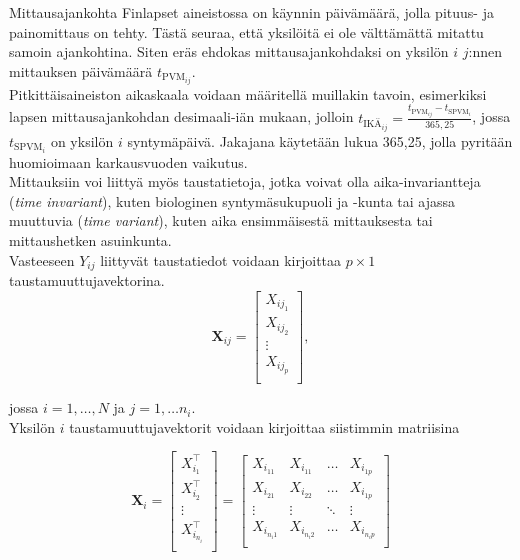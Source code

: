 \documentclass[finnish]{docopts}
\begin{document}
Mittausajankohta Finlapset aineistossa on käynnin päivämäärä, jolla pituus- ja painomittaus on tehty. Tästä seuraa, että yksilöitä ei ole välttämättä mitattu samoin ajankohtina. Siten eräs ehdokas mittausajankohdaksi on yksilön $i$ $j$:nnen mittauksen päivämäärä $t_{\text{PVM}_{ij}}$.\\

Pitkittäisaineiston aikaskaala voidaan määritellä muillakin tavoin, esimerkiksi lapsen mittausajankohdan desimaali-iän mukaan, jolloin $t_{\text{IKÄ}_{ij}} = \frac{t_{\text{PVM}_{ij}} - t_{\text{SPVM}_{i}}}{365,25}$, jossa $t_{\text{SPVM}_{i}}$ on yksilön $i$ syntymäpäivä. Jakajana käytetään lukua 365,25, jolla pyritään huomioimaan karkausvuoden vaikutus.\\ 

Mittauksiin voi liittyä myös taustatietoja, jotka voivat olla aika-invariantteja (\textit{time invariant}), kuten biologinen syntymäsukupuoli ja -kunta tai ajassa muuttuvia (\textit{time variant}), kuten aika ensimmäisestä mittauksesta tai mittaushetken asuinkunta.\\

Vasteeseen $Y_{ij}$ liittyvät taustatiedot voidaan kirjoittaa $p \times 1$ taustamuuttujavektorina. \\

$$
\bm{X}_{ij} = 
\begin{bmatrix}
X_{ij_{1}} \\
X_{ij_{2}} \\
\vdots \\
X_{ij_{p}} \\
\end{bmatrix},
$$

jossa $i = 1, \dots, N$ ja $j = 1, \dots n_i$. \\ 

Yksilön $i$ taustamuuttujavektorit voidaan kirjoittaa siistimmin matriisina

$$
\bm{X}_{i} = 
\begin{bmatrix}
X_{i_{1}}^\top \\
X_{i_{2}}^\top  \\
\vdots \\
X_{i_{n_i}}^\top  \\
\end{bmatrix}
=
\begin{bmatrix}
X_{i_{11}} & X_{i_{11}} & \dots & X_{i_{1p}} \\
X_{i_{21}} & X_{i_{22}} & \dots & X_{i_{1p}} \\
\vdots & \vdots & \ddots & \vdots \\
X_{i_{n_i1}} & X_{i_{n_i2}} & \dots & X_{i_{n_ip}} \\
\end{bmatrix}
$$\\
\end{document}
